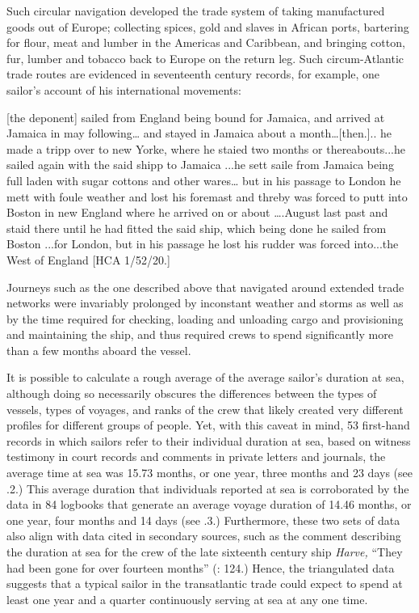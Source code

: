 Such circular navigation developed the trade system of taking manufactured goods out of Europe; collecting spices, gold and slaves in African ports, bartering for flour, meat and lumber in the Americas and Caribbean, and bringing cotton, fur, lumber and tobacco back to Europe on the return leg. Such circum-Atlantic trade routes are evidenced in seventeenth century records, for example, one sailor’s account of his international movements:

[the deponent] sailed from England being bound for Jamaica, and arrived at Jamaica in may following… and stayed in Jamaica about a month…[then.].. he made a tripp over to new Yorke, where he staied two months or thereabouts...he sailed again with the said shipp to Jamaica ...he sett saile from Jamaica being full laden with sugar cottons and other wares… but in his passage to London he mett with foule weather and lost his foremast and threby was forced to putt into Boston in new England where he arrived on or about ….August last past and staid there until he had fitted the said ship, which being done he sailed from Boston ...for London, but in his passage he lost his rudder was forced into...the West of England [HCA 1/52/20.]

Journeys such as the one described above that navigated around extended trade networks were invariably prolonged by inconstant weather and storms as well as by the time required for  checking, loading and unloading cargo and provisioning and maintaining the ship, and thus required crews to spend significantly more than a few months aboard the vessel. 

It is possible to calculate a rough average of the average sailor’s duration at sea, although doing so necessarily obscures the differences between the types of vessels, types of voyages, and ranks of the crew that likely created very different profiles for different groups of people. Yet, with this caveat in mind, 53 first-hand records in which sailors refer to their individual duration at sea, based on witness testimony in court records and comments in private letters and journals, the average time at sea was 15.73 months, or one year, three months and 23 days (see .2.) This average duration that individuals reported at sea is corroborated by the data in 84 logbooks that generate an average voyage duration of 14.46 months, or one year, four months and 14 days (see .3.) Furthermore, these two sets of data also align with data cited in secondary sources, such as the comment describing the duration at sea for the crew of the late sixteenth century ship \textit{Harve,} “They had been gone for over fourteen months” (\citealt{Bicheno2012}: 124.) Hence, the triangulated data suggests that a typical sailor in the transatlantic trade could expect to spend at least one year and a quarter continuously serving at sea at any one time. 

